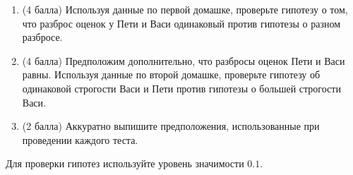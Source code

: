 \documentclass[12pt]{article} %
\begin{document}
\begin{enumerate}
\begin{enumerate}
    \item (4 балла) Используя данные по первой домашке, проверьте гипотезу о том, что разброс оценок у Пети и Васи одинаковый против гипотезы о разном разбросе.
    \item (4 балла) Предположим дополнительно, что разбросы оценок Пети и Васи равны. Используя данные по второй домашке, проверьте гипотезу об одинаковой строгости Васи и Пети против гипотезы о большей строгости Васи.
    \item (2 балла) Аккуратно выпишите предположения, использованные при проведении каждого теста.  
\end{enumerate}


Для проверки гипотез используйте уровень значимости $0.1$. 

 
\end{enumerate}
\end{document}
